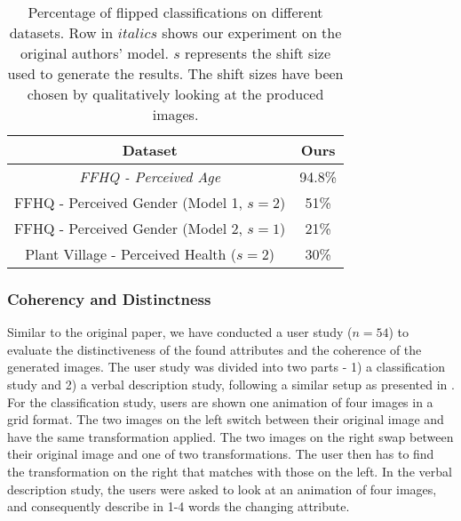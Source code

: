 
\begin{table}[h]
    \centering
    \begin{tabular}{ c | c }
    \toprule
    \textbf{Dataset} & \textbf{Ours} \\
    \midrule
    \textit{FFHQ - Perceived Age} & 94.8\% \\
    FFHQ - Perceived Gender (Model 1, $s=2$) & 51\% \\
    FFHQ - Perceived Gender (Model 2, $s=1$) & 21\% \\
    Plant Village - Perceived Health ($s=2$) & 30\% \\
    \bottomrule
    \end{tabular}
    \caption{Percentage of flipped classifications on different datasets. Row in $italics$ shows our experiment on the original authors' model. $s$ represents the shift size used to generate the results. The shift sizes have been chosen by qualitatively looking at the produced images.}
    \label{tab:sufficiency}
\end{table}


\subsubsection{Coherency and Distinctness}
Similar to the original paper, we have conducted a user study ($n=54$) to evaluate the distinctiveness of the found attributes and the coherence of the generated images. The user study was divided into two parts - 1) a classification study and 2) a verbal description study, following a similar setup as presented in \cite{yeh2020completenessaware}. For the classification study, users are shown one animation of four images in a grid format. The two images on the left switch between their original image and have the same transformation applied. The two images on the right swap between their original image and one of two transformations. The user then has to find the transformation on the right that matches with those on the left. In the verbal description study, the users were asked to look at an animation of four images, and consequently describe in 1-4 words the changing attribute.

